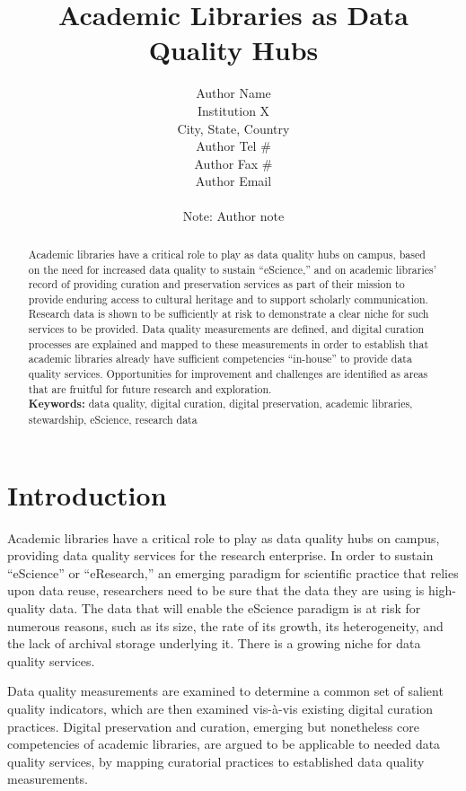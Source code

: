 \documentclass[12pt,letterpaper,titlepage,onecolumn,biblatex,backend=biber,style=chicago-authordate]{article}
\title{Academic Libraries as Data Quality Hubs}
\author{Author Name \\
Institution X \\
City, State, Country \\
Author Tel \# \\
Author Fax \# \\
Author Email \\
\\
Note: Author note}
\begin{document}
\maketitle
\begin{abstract}
Academic libraries have a critical role to play as data quality hubs
on campus, based on the need for increased data quality to sustain
``eScience,'' and on academic libraries' record of providing curation
and preservation services as part of their mission to provide enduring
access to cultural heritage and to support scholarly
communication. Research data is shown to be sufficiently at risk to
demonstrate a clear niche for such services to be provided. Data
quality measurements are defined, and digital curation processes are
explained and mapped to these measurements in order to establish that
academic libraries already have sufficient competencies ``in-house''
to provide data quality services. Opportunities for improvement and
challenges are identified as areas that are fruitful for future
research and exploration.
\\

{\bf Keywords:} data quality, digital curation, digital preservation, academic
libraries, stewardship, eScience, research data
\end{abstract}

\section{Introduction}
Academic libraries have a critical role to play as data quality hubs
on campus, providing data quality services for the research
enterprise. In order to sustain ``eScience'' or ``eResearch,'' an
emerging paradigm for scientific practice that relies upon data reuse,
researchers need to be sure that the data they are using is
high-quality data. The data that will enable the eScience paradigm is
at risk for numerous reasons, such as its size, the rate of its
growth, its heterogeneity, and the lack of archival storage underlying
it. There is a growing niche for data quality services.

Data quality measurements are examined to determine a common set of
salient quality indicators, which are then examined vis-\`{a}-vis
existing digital curation practices. Digital preservation and
curation, emerging but nonetheless core competencies of academic
libraries, are argued to be applicable to needed data quality
services, by mapping curatorial practices to established data quality
measurements.
\end{document}
